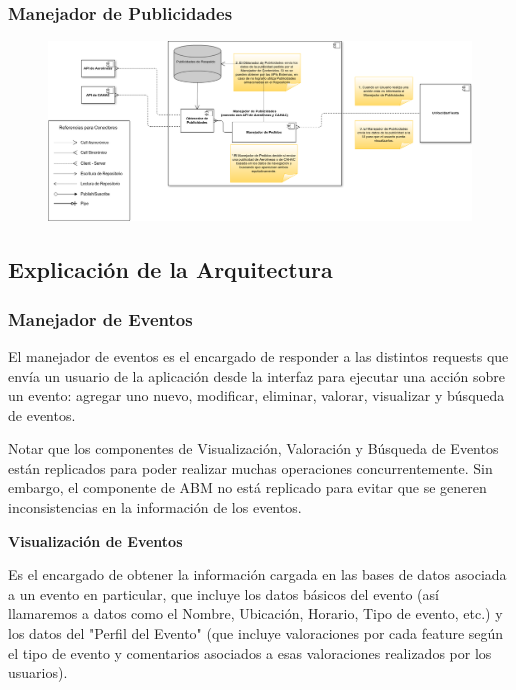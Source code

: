 \subsubsection{Manejador de Publicidades}

\begin{figure}[H]
  \centering
  \includegraphics[width=\textwidth]{diagramas/ManejadorDePublicidades.png}
  \caption{\normalfont }
\end{figure} 

\subsection{Explicación de la Arquitectura}

\subsubsection{Manejador de Eventos}

El manejador de eventos es el encargado de responder a las distintos requests que envía un usuario de la aplicación desde la interfaz para ejecutar una acción sobre un evento: agregar uno nuevo, modificar, eliminar, valorar, visualizar y búsqueda de eventos.

Notar que los componentes de Visualización, Valoración y Búsqueda de Eventos están replicados para poder realizar muchas operaciones concurrentemente. Sin embargo, el componente de ABM no está replicado para evitar que se generen inconsistencias en la información de los eventos.

\textbf{Visualización de Eventos}

Es el encargado de obtener la información cargada en las bases de datos asociada a un evento en particular, que incluye los datos básicos del evento (así llamaremos a datos como el Nombre, Ubicación, Horario, Tipo de evento, etc.) y los datos del "Perfil del Evento" (que incluye valoraciones por cada feature según el tipo de evento y comentarios asociados a esas valoraciones realizados por los usuarios).

